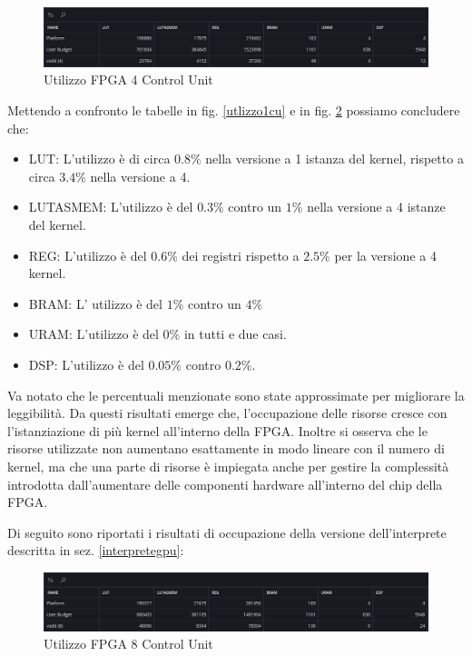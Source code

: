 \begin{figure}[h!]
\centering
\includegraphics[scale=0.40]{images/Capitolo5/6_im.png}
\caption{Utilizzo FPGA 4 Control Unit}
\label{utilizzo4cu}
\end{figure}
 
Mettendo a confronto le tabelle in fig. \ref{utlizzo1cu} e in fig. \ref{utilizzo4cu} possiamo concludere che:

\begin{itemize}
    \item LUT: L'utilizzo è di circa $0.8 \%$ nella versione a 1 istanza del kernel, rispetto a circa $3.4 \%$ nella versione a 4.
    \item LUTASMEM: L'utilizzo è del $0.3 \%$ contro un $1 \%$ nella versione a 4 istanze del kernel.
    \item REG: L'utilizzo è del $0.6 \%$ dei registri rispetto a $2.5 \%$ per la versione a 4 kernel.
    \item BRAM: L' utilizzo è del $1 \%$ contro un $4 \%$ 
    \item URAM: L'utilizzo è del $0 \%$ in tutti e due casi.
    \item DSP: L'utilizzo è del $0.05 \%$ contro $0.2 \%$.
\end{itemize}
Va notato che le percentuali menzionate sono state approssimate per migliorare la leggibilità.
Da questi risultati emerge che, l'occupazione delle risorse cresce con l'istanziazione di più kernel all'interno della FPGA. Inoltre si osserva che le risorse utilizzate non aumentano esattamente in modo lineare con il numero di kernel, ma che una parte di risorse è impiegata anche per gestire la complessità introdotta dall'aumentare delle componenti hardware all'interno del chip della FPGA.

\vspace{0.3cm}

\clearpage

\noindent Di seguito sono riportati i risultati di occupazione della versione dell'interprete descritta in sez. \ref{interpretegpu}: 

\begin{figure}[h!]
\centering
\includegraphics[scale=0.40]{images/Capitolo5/7_im.png}
\caption{Utilizzo FPGA 8 Control Unit}
\label{utilizzo4cu}
\end{figure}

